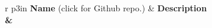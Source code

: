 \vspace{-0.5cm}
\begin{center}
    {\small
    \def\arraystretch{1.1}
    \begin{longtable}{r p{3in}}%
        \normalsize \textbf{Name} (click for Github repo.) & \normalsize\bfseries Description%
        \normalsize \csvreader[separator=semicolon, head to column names]{github-sbry.csv}{}%
        {\\ \href{\url}{\texttt{\name}} & \description}%
    \end{longtable}
    }
\end{center}



